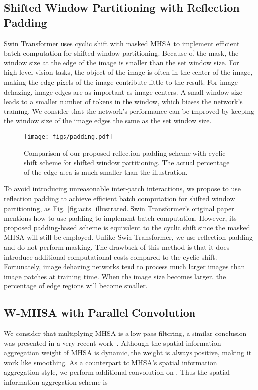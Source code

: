\documentclass[journal]{IEEEtran}
\begin{document}
\subsection{Shifted Window Partitioning with Reflection Padding}

Swin Transformer uses cyclic shift with masked MHSA to implement efficient batch computation for shifted window partitioning.
Because of the mask, the window size at the edge of the image is smaller than the set window size.
For high-level vision tasks, the object of the image is often in the center of the image, making the edge pixels of the image contribute little to the result.
For image dehazing, image edges are as important as image centers.
A small window size leads to a smaller number of tokens in the window, which biases the network's training.
We consider that the network's performance can be improved by keeping the window size of the image edges the same as the set window size.

\begin{figure}[t]
    \centering
    \texttt{[image: figs/padding.pdf]}
    \caption{
        Comparison of our proposed reflection padding scheme with cyclic shift scheme for shifted window partitioning. 
        The actual percentage of the edge area is much smaller than the illustration.
    }
    \label{fig:padding}
\end{figure}

To avoid introducing unreasonable inter-patch interactions, we propose to use reflection padding to achieve efficient batch computation for shifted window partitioning, as Fig.~\ref{fig:acts} illustrated.
Swin Transformer's original paper mentions how to use padding to implement batch computation.
However, its proposed padding-based scheme is equivalent to the cyclic shift since the masked MHSA will still be employed.
Unlike Swin Transformer, we use reflection padding and do not perform masking.
The drawback of this method is that it does introduce additional computational costs compared to the cyclic shift. 
Fortunately, image dehazing networks tend to process much larger images than image patches at training time. 
When the image size becomes larger, the percentage of edge regions will become smaller.

\subsection{W-MHSA with Parallel Convolution}

We consider that multiplying MHSA is a low-pass filtering, a similar conclusion was presented in a very recent work~\cite{park2022vision}.
Although the spatial information aggregation weight of MHSA is dynamic, the weight is always positive, making it work like smoothing.
As a counterpart to MHSA's spatial information aggregation style, we perform additional convolution on .
Thus the spatial information aggregation scheme is
\end{document}
